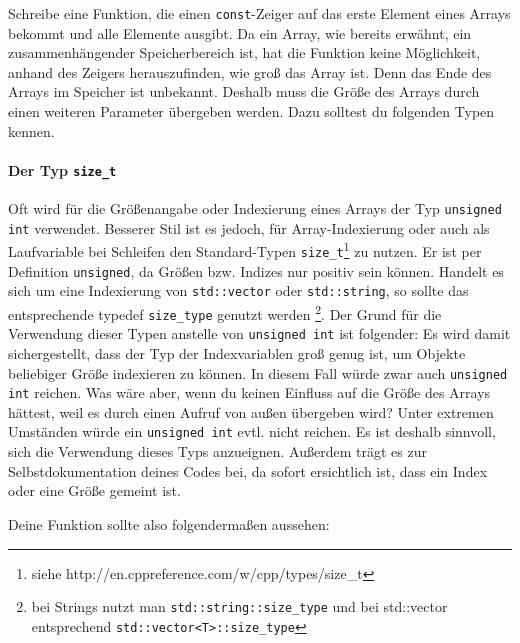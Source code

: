 Schreibe eine Funktion, die einen \lstinline{const}-Zeiger auf das erste Element eines Arrays bekommt und alle Elemente ausgibt.
Da ein Array, wie bereits erwähnt, ein zusammenhängender Speicherbereich ist, hat die Funktion keine Möglichkeit, anhand des Zeigers herauszufinden, wie groß das Array ist. 
Denn das Ende des Arrays im Speicher ist unbekannt. 
Deshalb muss die Größe des Arrays durch einen weiteren Parameter übergeben werden. Dazu solltest du folgenden Typen kennen.

\paragraph{Der Typ \lstinline$size_t$}
Oft wird für die Größenangabe oder Indexierung eines Arrays der Typ \lstinline{unsigned int} verwendet. 
Besserer Stil ist es jedoch, für Array-Indexierung oder auch als Laufvariable bei Schleifen den Standard-Typen \lstinline$size_t$\footnote{siehe http://en.cppreference.com/w/cpp/types/size\_t} zu nutzen.
Er ist per Definition \lstinline$unsigned$, da Größen bzw. Indizes nur positiv sein können.
Handelt es sich um eine Indexierung von \lstinline{std::vector} oder \lstinline{std::string}, so sollte das entsprechende typedef \lstinline{size_type} genutzt werden
\footnote{bei Strings nutzt man \lstinline$std::string::size_type$ und bei std::vector entsprechend \lstinline$std::vector<T>::size_type$}.
Der Grund für die Verwendung dieser Typen anstelle von \lstinline{unsigned int} ist folgender: 
Es wird damit sichergestellt, dass der Typ der Indexvariablen groß genug ist, um Objekte beliebiger Größe indexieren zu können.
In diesem Fall würde zwar auch \lstinline{unsigned int} reichen. 
Was wäre aber, wenn du keinen Einfluss auf die Größe des Arrays hättest, weil es durch einen Aufruf von außen übergeben wird?
Unter extremen Umständen würde ein \lstinline{unsigned int} evtl. nicht reichen.
Es ist deshalb sinnvoll, sich die Verwendung dieses Typs anzueignen.
Außerdem trägt es zur Selbstdokumentation deines Codes bei, da sofort ersichtlich ist, dass ein Index oder eine Größe gemeint ist.

Deine Funktion sollte also folgendermaßen aussehen:



